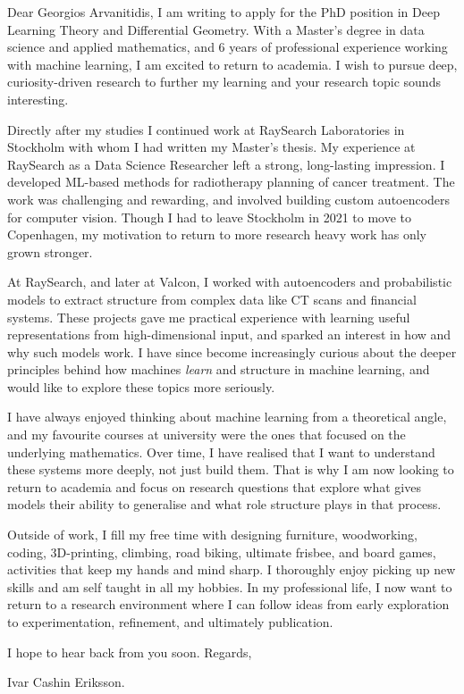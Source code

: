 \documentclass[11pt,a4paper]{moderncv}
\begin{document}
\makecvtitle
Dear Georgios Arvanitidis, I am writing to apply for the PhD position in Deep Learning Theory and Differential Geometry. With a Master's degree in data science and applied mathematics, and 6 years of professional experience working with machine learning, I am excited to return to academia. I wish to pursue deep, curiosity-driven research to further my learning and your research topic sounds interesting. 

\hspace*{2em}
Directly after my studies I continued work at RaySearch Laboratories in Stockholm with whom I had written my Master's thesis. My experience at RaySearch as a Data Science Researcher left a strong, long-lasting impression. I developed ML-based methods for radiotherapy planning of cancer treatment. The work was challenging and rewarding, and involved building custom autoencoders for computer vision. Though I had to leave Stockholm in 2021 to move to Copenhagen, my motivation to return to more research heavy work has only grown stronger. 

\hspace*{2em}
At RaySearch, and later at Valcon, I worked with autoencoders and probabilistic models to extract structure from complex data like CT scans and financial systems. These projects gave me practical experience with learning useful representations from high-dimensional input, and sparked an interest in how and why such models work. I have since become increasingly curious about the deeper principles behind how machines \textit{learn} and structure in machine learning, and would like to explore these topics more seriously.

\hspace*{2em}
I have always enjoyed thinking about machine learning from a theoretical angle, and my favourite courses at university were the ones that focused on the underlying mathematics. Over time, I have realised that I want to understand these systems more deeply, not just build them. That is why I am now looking to return to academia and focus on research questions that explore what gives models their ability to generalise and what role structure plays in that process.

\hspace*{2em}
Outside of work, I fill my free time with designing furniture, woodworking,  coding, 3D-printing, climbing, road biking, ultimate frisbee, and board games, activities that keep my hands and mind sharp. I thoroughly enjoy picking up new skills and am self taught in all my hobbies. In my professional life, I now want to return to a research environment where I can follow ideas from early exploration to experimentation, refinement, and ultimately publication.

\vspace{8 mm}
I hope to hear back from you soon. Regards, 

\vspace{3 mm} 
Ivar Cashin Eriksson.
\end{document}

